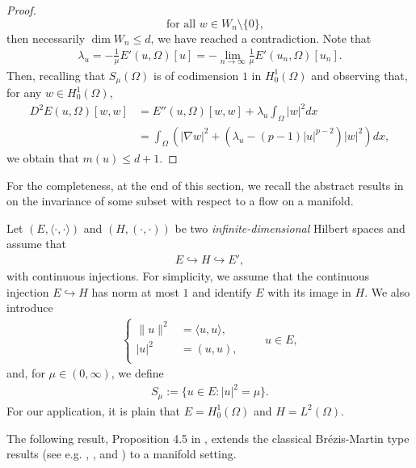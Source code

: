 \documentclass[10pt,a4paper]{article}
\theoremstyle{definition} \theoremstyle{remark}
\numberwithin{equation}{section}
\newcommand{\la}{\lambda}
\begin{document}
\begin{proof}
\begin{equation*}
		\quad \text{for all } w \in W_n \setminus \{0\},
	\end{equation*}
	then necessarily $\dim W_n \leq d$, we have reached a contradiction. Note that
	\begin{align*}
		\la_u = -\frac1\mu E'(u,\Omega)[u] = -\lim_{n\to\infty}\frac1\mu E'(u_n,\Omega)[u_n].
	\end{align*}
	Then, recalling that $S_\mu(\Omega)$ is of codimension $1$ in $H_0^1(\Omega)$ and observing that, for any $w \in H_0^1(\Omega)$,
	\begin{align*}
		D^2 E(u,\Omega)[w,w] & = E''(u,\Omega)[w,w] + \la_u\int_\Omega|w|^2dx \\
		& = \int_\Omega\left( |\nabla w|^2 + \left(\la_u-(p-1)|u|^{p-2}\right)|w|^2 \right)dx,
	\end{align*}
	we obtain that $m(u) \leq d+1$.
\end{proof}

For the completeness, at the end of this section, we recall the abstract results in \cite{JS} on the invariance of some subset with respect to a flow on a manifold.

\vskip0.1in

Let $(E,\langle \cdot,\cdot\rangle)$ and $(H,( \cdot,\cdot))$ be two \emph{infinite-dimensional} Hilbert spaces and assume that
\begin{align*}
	E \hookrightarrow H \hookrightarrow E',
\end{align*}
with continuous injections. For simplicity, we assume that the continuous injection $E \hookrightarrow H$ has norm at most $1$ and identify $E$ with its image in $H$. We also introduce
\begin{align*}
	\left\{
	\begin{aligned}
		\|u\|^2 & = \langle u,u \rangle, \\
		|u|^2 \ & = (u,u), \\
	\end{aligned}
	\right.
	\quad \quad u \in E,
\end{align*}
and, for $\mu \in (0,\infty)$, we define
\begin{align*}
	S_\mu := \bigl\{u \in E: |u|^2 = \mu \bigr\}.
\end{align*}
For our application, it is plain that $E = H_0^1(\Omega)$ and $H = L^2(\Omega)$.


\vskip0.1in


The following result, Proposition 4.5 in \cite{JS}, extends the classical Br\'ezis-Martin type results (see e.g. \cite[Theorem 1]{Bre}, \cite[Theorem 3]{Mar1}, and \cite[Theorem 4.1]{Dei}) to a manifold setting.
\end{document}
